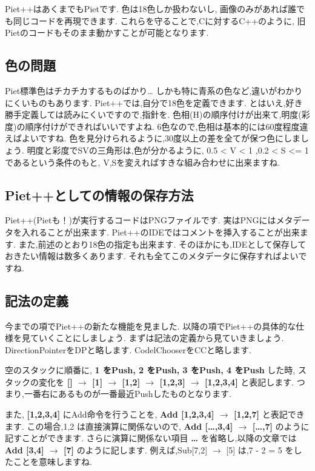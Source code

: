 Piet++はあくまでもPietです. 色は18色しか扱わないし,
画像のみがあれば誰でも同じコードを再現できます.
これらを守ることで,Cに対するC++のように,
旧Pietのコードもそのまま動かすことが可能となります.

\subsection{色の問題}

Piet標準色はチカチカするものばかり\ldots{}
しかも特に青系の色など,違いがわかりにくいものもあります.
Piet++では,自分で18色を定義できます.
とはいえ,好き勝手定義しては読みにくいですので,指針を.
色相(H)の順序付けが出来て,明度(彩度)の順序付けができればいいですよね.
6色なので,色相は基本的には60度程度違えばよいですね.
色を見分けられるように,30度以上の差を全てが保つ色にしましょう.
明度と彩度でSVの三角形は,色が分かるように, 0.5 \textless{} V \textless{}
1 ,0.2 \textless{} S \textless{}= 1であるという条件のもと,
V,Sを変えればすきな組み合わせに出来ますね.

\subsection{Piet++としての情報の保存方法}

Piet++(Pietも！)が実行するコードはPNGファイルです.
実はPNGにはメタデータを入れることが出来ます.
Piet++のIDEではコメントを挿入することが出来ます.
また,前述のとおり18色の指定も出来ます.
そのほかにも,IDEとして保存しておきたい情報は数多くあります.
それも全てこのメタデータに保存すればよいですね.

\subsection{記法の定義}

今までの項でPiet++の新たな機能を見ました.
以降の項でPiet++の具体的な仕様を見ていくことにしましょう.
まずは記法の定義から見ていきましょう. DirectionPointerをDPと略します.
CodelChooserをCCと略します.

空のスタックに順番に, \textbf{1 をPush, 2 をPush, 3 をPush, 4 をPush}
した時, スタックの変化を \textbf{{[}{]} $\to$ {[}1{]}
$\to$ {[}1,2{]} $\to$ {[}1,2,3{]} $\to$
{[}1,2,3,4{]}} と表記します.
つまり,一番右にあるものが一番最近Pushしたものとなります.

また, \textbf{{[}1,2,3,4{]}} にAdd命令を行うことを, \textbf{Add
{[}1,2,3,4{]} $\to$ {[}1,2,7{]}} と表記できます. この場合,1,2
は直接演算に関係ないので, \textbf{Add {[}\ldots{},3,4{]} $\to$
{[}\ldots{},7{]}} のように記すことができます. さらに演算に関係ない項目
\textbf{\ldots{}} を省略し,以降の文章では \textbf{Add {[}3,4{]}
$\to$ {[}7{]}} のように記します. 例えば,Sub{[}7,2{]}
$\to$ {[}5{]} は,7 - 2 = 5 をしたことを意味しますね.

